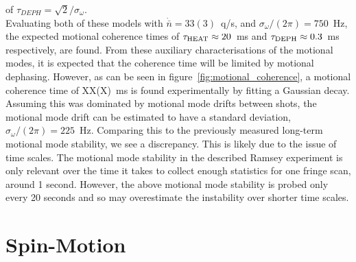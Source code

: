     of $\tau_{DEPH} = \sqrt{2}/\sigma_{\omega}$.\\
    Evaluating both of these models with $\dot{\bar{n}}=33(3)$~q/s, and
    $\sigma_{\omega}/(2\pi) = 750$~Hz, the expected motional coherence times of $\tau_{\rm
    HEAT} \approx 20$~ms and $\tau_{\rm DEPH} \approx 0.3$~ms respectively, are found. From these auxiliary characterisations of the motional modes, it is expected that the coherence time will be limited by motional dephasing.  However, as can be
    seen in figure~\ref{fig:motional_coherence}, a
    motional coherence time of XX(X)~ms is found experimentally by fitting a Gaussian decay.  \\
    Assuming this was dominated by motional mode drifts between shots, the motional mode drift can be estimated to have a standard deviation, $\sigma_{\omega}/(2\pi) =
    225$~Hz. Comparing this to the previously measured long-term motional mode
    stability, we see a discrepancy. This is likely due to the issue of time
    scales. The motional mode stability in the described Ramsey experiment is
    only relevant over the time it takes to collect enough statistics for one
    fringe scan, around 1 second. However, the above motional mode stability is
    probed only every 20 seconds and so may overestimate the instability over
    shorter time scales.\\ 


\section{Spin-Motion}
